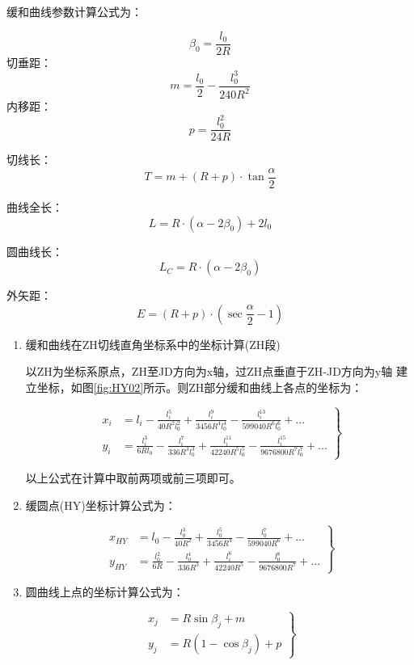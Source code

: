  缓和曲线参数计算公式为：

 $$\beta_0 = \frac{l_0}{2R} $$
切垂距：
$$m=\frac{l_0}{2} - \frac{l^3_0}{240R^2}$$
内移距：
$$p=\frac{l^2_0}{24R}$$

 
 切线长：$$T = m+ (R+p) \cdot \tan \frac{\alpha}{2}$$

 曲线全长：$$L = R \cdot (\alpha-2\beta_0)  + 2l_0$$

 圆曲线长：$$L_C = R \cdot (\alpha-2\beta_0)$$

 外矢距：$$E=(R+p) \cdot (\sec \frac{\alpha}{2} - 1)$$

\begin{enumerate}

\item  缓和曲线在ZH切线直角坐标系中的坐标计算(ZH段)

以ZH为坐标系原点，ZH至JD方向为x轴，过ZH点垂直于ZH-JD方向为y轴
建立坐标，如图\ref{fig:HY02}所示。则ZH部分缓和曲线上各点的坐标为：

\begin{equation}
\left .
\begin{aligned}
x_i &= l_i - \frac{l^5_i}{40R^2 l^2_0} + \frac{l^9_i}{3456R^4 l^4_0} - \frac{l^{13}_i}{599040R^6l^6_0} + ...  \\
y_i &=  \frac{l^3_i}{6Rl_0} - \frac{l^7_i}{336R^3 l^3_0} + \frac{l^{11}_i}{42240R^5l^5_0} -\frac{l^{15}_i}{9676800R^7l^7_0}+ ...  
\end{aligned} 
\right \}
\label{eq:routeZHXY}
\end{equation}

以上公式在计算中取前两项或前三项即可。

\item  缓圆点(HY)坐标计算公式为：

\begin{equation}
\left . \begin{aligned}
x_{HY} &= l_0 - \frac{l^3_0}{40R^2} + \frac{l^5_0}{3456R^4} - \frac{l^{7}_0}{599040R^6} + ...  \\
y_{HY} &=  \frac{l^2_0}{6R} - \frac{l^4_0}{336R^3} + \frac{l^{6}_i}{42240R^5} -\frac{l^{8}_0}{9676800R^7}+ ...  
\end{aligned} \right \}
\label{eq:routeHY}
\end{equation}

\item  圆曲线上点的坐标计算公式为：

\begin{equation}
\left . \begin{aligned}
x_{j} &= R \sin \beta_j + m \\
y_{j} &= R(1- \cos \beta_j) +p 
\end{aligned} \right \}
\label{eq:routeYQXY}
\end{equation}


\end{enumerate}
